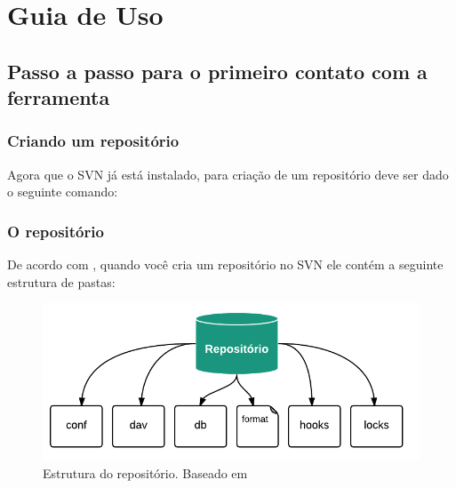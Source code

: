 \chapter[Guia de Uso]{Guia de Uso}

\section{Passo a passo para o primeiro contato com a ferramenta}

\subsection{Criando um repositório}

Agora que o SVN já está instalado, para criação de um repositório deve ser dado o seguinte comando:


\colorbox{PineGreen}{
\begin{minipage}{200px}
\end{minipage}
}

\subsection{O repositório}

De acordo com \cite{svn-book}, quando você cria um repositório no SVN ele contém a seguinte estrutura de pastas:

\begin{figure}[!htb]
\centering
\includegraphics[scale=1]{figuras/repositorio.png}
\caption{Estrutura do repositório. Baseado em \cite{svn-book}}
\end{figure}


